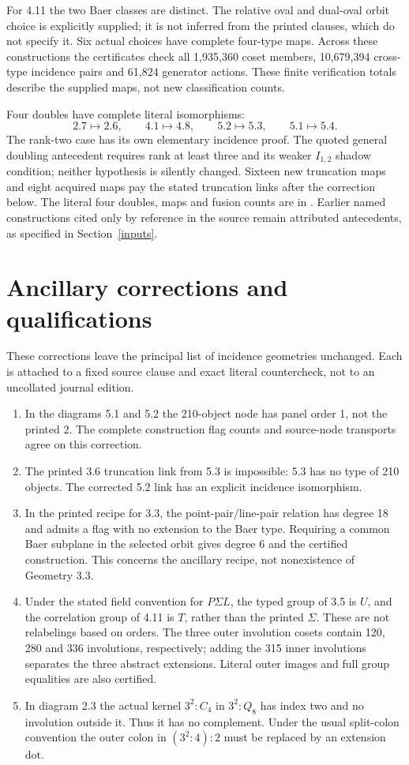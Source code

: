 \documentclass[11pt]{article}
\begin{document}
For 4.11 the two Baer classes are distinct. The relative oval and
dual-oval orbit choice is explicitly supplied; it is not inferred
from the printed clauses, which do not specify it. Six actual
choices have complete four-type maps. Across these constructions
the certificates check all 1,935,360 coset members, 10,679,394
cross-type incidence pairs and 61,824 generator actions. These
finite verification totals describe the supplied maps, not new
classification counts.

Four doubles have complete literal isomorphisms:
\[
2.7\longmapsto2.6,\qquad4.1\longmapsto4.8,\qquad
5.2\longmapsto5.3,\qquad5.1\longmapsto5.4.
\]
The rank-two case has its own elementary incidence proof. The quoted
general doubling antecedent requires rank at least three and its
weaker $I_{1,2}$ shadow condition; neither hypothesis is silently
changed. Sixteen new truncation maps and eight acquired maps pay
the stated truncation links after the correction below. The literal
four doubles, maps and fusion counts are in \cite{Double}. Earlier
named constructions cited only by reference in the source remain
attributed antecedents, as specified in Section~\ref{inputs}.

\section{Ancillary corrections and qualifications}\label{corrections}
These corrections leave the principal list of incidence geometries
unchanged. Each is attached to a fixed source clause and exact
literal countercheck, not to an uncollated journal edition.
\begin{enumerate}
\item In the diagrams 5.1 and 5.2 the 210-object node has panel
order 1, not the printed 2. The complete construction flag counts
and source-node transports agree on this correction.
\item The printed 3.6 truncation link from 5.3 is impossible:
5.3 has no type of 210 objects. The corrected 5.2 link has an
explicit incidence isomorphism.
\item In the printed recipe for 3.3, the point-pair/line-pair
relation has degree 18 and admits a flag with no extension to the
Baer type. Requiring a common Baer subplane in the selected orbit
gives degree 6 and the certified construction. This concerns the
ancillary recipe, not nonexistence of Geometry 3.3.
\item Under the stated field convention for $P\Sigma L$, the
typed group of 3.5 is $U$, and the correlation group of 4.11 is
$T$, rather than the printed $\Sigma$. These are not relabelings
based on orders. The three outer involution cosets contain 120,
280 and 336 involutions, respectively; adding the 315 inner
involutions separates the three abstract extensions. Literal
outer images and full group equalities are also certified.
\item In diagram 2.3 the actual kernel $3^2:C_4$ in $3^2:Q_8$
has index two and no involution outside it. Thus it has no
complement. Under the usual split-colon convention the outer
colon in $(3^2:4):2$ must be replaced by an extension dot.
\end{enumerate}
\end{document}
